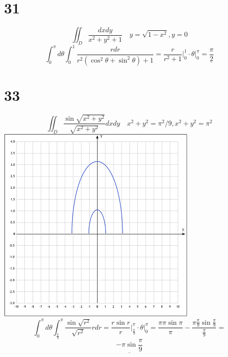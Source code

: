 \documentclass[a4paper, 12pt]{article}
\begin{document}
\section*{31}
\[
	\iint_{D}{ \frac{dx dy}{x^2+y^2+1}} \quad y=\sqrt{1-x^2} ,y = 0
\]
\[
	\int_0^{\pi}d\theta\int_0^1\frac{rdr}{r^2(\cos^2\theta+\sin^2\theta)+1} = \frac{r}{r^2 +1}\big|_0^1 \cdot \theta\big|_0^\pi = \underline{\frac{\pi}{2}}
\]
\section*{33}
\[
	\iint_{D}{ \frac{\sin \sqrt {x^2+y^2}}{\sqrt{x^2+y^2}} dx dy} \quad x^2+y^2=\pi^2/9,x^2+y^2=\pi^2 
\]
\includegraphics{img/2.png}
\[
	\int_0^\pi d\theta\int_{\frac{\pi}{9}}^\pi\frac{\sin \sqrt {r^2}}{\sqrt{r^2}}rdr = \frac{r\sin r}{r}\big|_{\frac{\pi}{9}}^\pi\cdot\theta\big|_0^\pi = \frac{\pi\pi\sin \pi}{\pi}-\frac{\pi\frac{\pi}{9}\sin \frac{\pi}{9}}{\frac{\pi}{9}} = 
\]
\[
	\underline{-\pi\sin \frac{\pi}{9}}
\]
\end{document}
